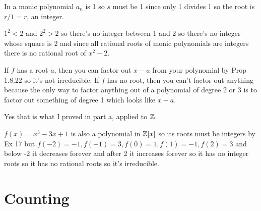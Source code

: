 \documentclass[11pt, oneside]{article}   	%
\begin{document}
\item In a monic polynomial $a_n$ is 1 so $s$ must be 1 since only 1 divides 1 so the root is $r/1 = r$, an integer.
\item $1^2 < 2$ and $2^2 > 2$ so there's no integer between 1 and 2 so there's no integer whose square is 2 and since all rational roots of monic polynomials are integers there is no rational root of $x^2 - 2$. 
\ee
\item \be
\item If $f$ has a root $a$, then you can factor out $x-a$ from your polynomial by Prop 1.8.22 so it's not irreducible. If $f$ has no root, then you can't factor out anything because the only way to factor anything out of a polynomial of degree 2 or 3 is to factor out something of degree 1 which looks like $x-a$. 
\item Yes that is what I proved in part a, applied to $\mathbb{Z}$.
\item $f(x) = x^3 - 3x + 1$ is also a polynomial in $\mathbb{Z}[x]$ so its roots must be integers by Ex 17 but $f(-2) = -1, f(-1) = 3, f(0) = 1, f(1) = -1, f(2) = 3$ and below -2 it decreases forever and after 2 it increases forever so it has no integer roots so it has no rational roots so it's irreducible.
\ee
\ee

\section{Counting}
\end{document}
